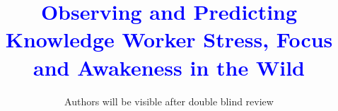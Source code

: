 \documentclass[final,1p,times,plainnat]{elsarticle}
\newcommand{\rev}[1]{\textcolor{blue}{#1}}
\begin{document}
\begin{frontmatter}

\title{\rev{Observing and Predicting Knowledge Worker Stress, Focus and Awakeness in the Wild}}

\author{Authors will be visible after double blind review}


\begin{comment}
	
\author{Mauricio Soto}
\affiliation{%
\institution{ABB Future Labs}
\city{Raleigh}
\state{North Carolina}
}
\email{mauricio.soto@us.abb.com}

\author{Chris Satterfield}
\affiliation{%
\institution{The University of British Columbia}
\city{Vancouver}
\state{British Columbia}
}
\email{cds00@cs.ubc.ca}
	
\author{Thomas Fritz}
\affiliation{%
\institution{University of Zurich}
\city{Zurich}
\state{Switzerland}
}
\email{fritz@ifi.uzh.ch}
	
\author{Gail C. Murphy}
\affiliation{%
\institution{The University of British Columbia}
\city{Vancouver}
\state{British Columbia}
}
\email{murphy@cs.ubc.ca}
	
\author{David Shepherd}
\affiliation{%
\institution{Virginia Commonwealth University}
\city{Richmond}
\state{Virginia}
}
\email{shepherdd@vcu.edu}
	
\author{Nicholas Kraft}
\affiliation{%
\institution{UserVoice}
\city{Raleigh}
\state{North Carolina}
}
\email{kraft.nicholas.a@gmail.com} \\}
	
\end{comment}


\end{frontmatter}
\end{document}
